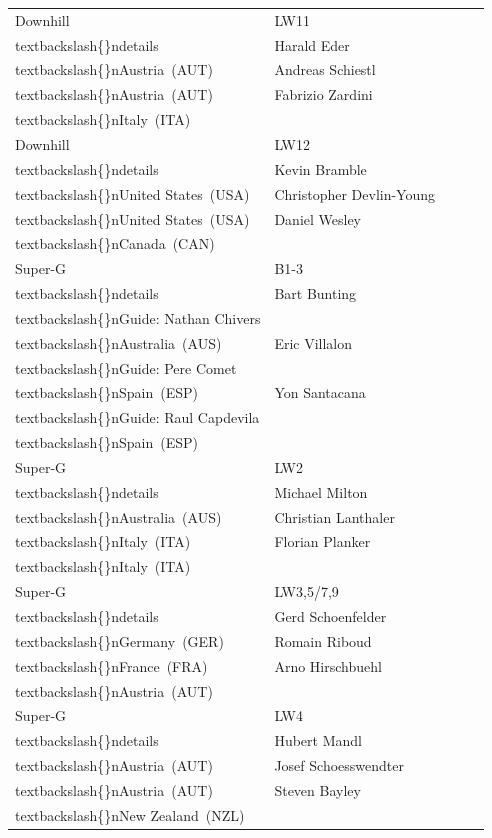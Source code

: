 \documentclass{article}
\begin{document}
\begin{tabular}{lllll}
Downhill & LW11\\textbackslash\{\}ndetails & Harald Eder\\textbackslash\{\}nAustria (AUT) & Andreas Schiestl\\textbackslash\{\}nAustria (AUT) & Fabrizio Zardini\\textbackslash\{\}nItaly (ITA) \\
Downhill & LW12\\textbackslash\{\}ndetails & Kevin Bramble\\textbackslash\{\}nUnited States (USA) & Christopher Devlin-Young\\textbackslash\{\}nUnited States (USA) & Daniel Wesley\\textbackslash\{\}nCanada (CAN) \\
Super-G & B1-3\\textbackslash\{\}ndetails & Bart Bunting\\textbackslash\{\}nGuide: Nathan Chivers\\textbackslash\{\}nAustralia (AUS) & Eric Villalon\\textbackslash\{\}nGuide: Pere Comet\\textbackslash\{\}nSpain (ESP) & Yon Santacana\\textbackslash\{\}nGuide: Raul Capdevila\\textbackslash\{\}nSpain (ESP) \\
Super-G & LW2\\textbackslash\{\}ndetails & Michael Milton\\textbackslash\{\}nAustralia (AUS) & Christian Lanthaler\\textbackslash\{\}nItaly (ITA) & Florian Planker\\textbackslash\{\}nItaly (ITA) \\
Super-G & LW3,5/7,9\\textbackslash\{\}ndetails & Gerd Schoenfelder\\textbackslash\{\}nGermany (GER) & Romain Riboud\\textbackslash\{\}nFrance (FRA) & Arno Hirschbuehl\\textbackslash\{\}nAustria (AUT) \\
Super-G & LW4\\textbackslash\{\}ndetails & Hubert Mandl\\textbackslash\{\}nAustria (AUT) & Josef Schoesswendter\\textbackslash\{\}nAustria (AUT) & Steven Bayley\\textbackslash\{\}nNew Zealand (NZL) \\

\end{tabular}
\end{document}
